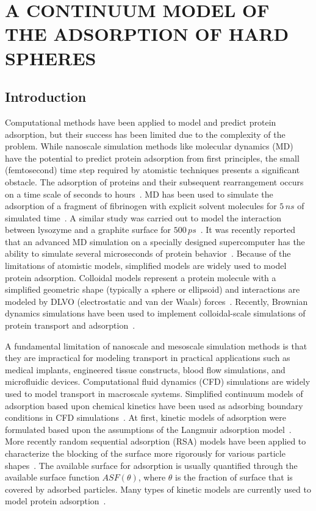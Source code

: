 
\chapter{\texorpdfstring{A CONTINUUM MODEL OF THE ADSORPTION OF HARD SPHERES}{CHAPTER . A CONTINUUM MODEL OF THE ADSORPTION OF HARD SPHERES}}


\section{Introduction}

Computational methods have been applied to model and predict protein
adsorption, but their success has been limited due to the complexity
of the problem. While nanoscale simulation methods like molecular
dynamics (MD) have the potential to predict protein adsorption from
first principles, the small (femtosecond) time step required by atomistic
techniques presents a significant obstacle. The adsorption of proteins
and their subsequent rearrangement occurs on a time scale of seconds
to hours~\cite{Latour2005}. MD has been used to simulate the adsorption
of a fragment of fibrinogen with explicit solvent molecules for $5\, ns$
of simulated time~\cite{Agashe2005}. A similar study was carried
out to model the interaction between lysozyme and a graphite surface
for $500\, ps$~\cite{Raffaini2010}. It was recently reported that
an advanced MD simulation on a specially designed supercomputer has
the ability to simulate several microseconds of protein behavior~\cite{Dror2010}.
Because of the limitations of atomistic models, simplified models
are widely used to model protein adsorption. Colloidal models represent
a protein molecule with a simplified geometric shape (typically a
sphere or ellipsoid) and interactions are modeled by DLVO (electrostatic
and van der Waals) forces~\cite{evans1994colloidal,Roth1993,Lenhoff1995}.
Recently, Brownian dynamics simulations have been used to implement
colloidal-scale simulations of protein transport and adsorption~\cite{Unni2005,Magan2006,Quinn2008}. 

A fundamental limitation of nanoscale and mesoscale simulation methods
is that they are impractical for modeling transport in practical applications
such as medical implants, engineered tissue constructs, blood flow
simulations, and microfluidic devices. Computational fluid dynamics
(CFD) simulations are widely used to model transport in macroscale
systems. Simplified continuum models of adsorption based upon chemical
kinetics have been used as adsorbing boundary conditions in CFD simulations~\cite{Jenkins2004,Glaser1993,Edwards1999}.
At first, kinetic models of adsorption were formulated based upon
the assumptions of the Langmuir adsorption model~\cite{Andrade1986}.
More recently random sequential adsorption (RSA) models have been
applied to characterize the blocking of the surface more rigorously
for various particle shapes~\cite{Talbot2000287}. The available
surface for adsorption is usually quantified through the available
surface function $ASF\left(\theta\right)$, where $\theta$ is the
fraction of surface that is covered by adsorbed particles. Many types
of kinetic models are currently used to model protein adsorption~\cite{Rabe2010}. 


